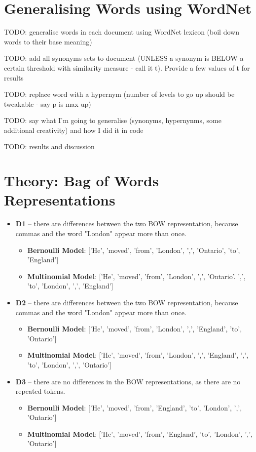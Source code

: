 \documentclass{article}
\begin{document}
\section{Generalising Words using WordNet}

TODO: generalise words in each document using WordNet lexicon (boil down words to their base meaning)

TODO: add all synonyms sets to document (UNLESS a synonym is BELOW a certain threshold with similarity measure - call it t). Provide a few values of t for results

TODO: replace word with a hypernym (number of levels to go up should be tweakable - say p is max up)

TODO: say what I'm going to generalise (synonyms, hypernynms, some additional creativity) and how I did it in code

TODO: results and discussion

\section{Theory: Bag of Words Representations}

\begin{itemize}
	\item \textbf{D1} -- there are differences between the two BOW representation, because commas and the word "London" appear more than once. \begin{itemize}
		\item \textbf{Bernoulli Model}: ['He', 'moved', 'from', 'London', ',', 'Ontario', 'to', 'England']
		\item \textbf{Multinomial Model}: ['He', 'moved', 'from', 'London', ',', 'Ontario'. ',', 'to', 'London', ',', 'England']
		\end{itemize}
	\item \textbf{D2} -- there are differences between the two BOW representation, because commas and the word "London" appear more than once. \begin{itemize}
		\item \textbf{Bernoulli Model}: ['He', 'moved', 'from', 'London', ',', 'England', 'to', 'Ontario']
		\item \textbf{Multinomial Model}: ['He', 'moved', 'from', 'London', ',', 'England', ',', 'to', 'London', ',', 'Ontario']
	  \end{itemize}
	\item \textbf{D3} -- there are no differences in the BOW representations, as there are no repeated tokens.
	\begin{itemize}
	\item \textbf{Bernoulli Model}: ['He', 'moved', 'from', 'England', 'to', 'London', ',', 'Ontario']
	\item \textbf{Multinomial Model}: ['He', 'moved', 'from', 'England', 'to', 'London', ',', 'Ontario']
	\end{itemize}
\end{itemize}
\end{document}
